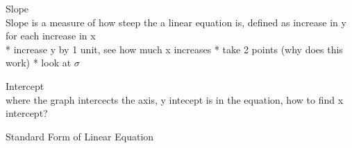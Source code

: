 \documentclass{book}
\begin{document}

  {\remark Slope \\
    Slope is a measure of how steep the a linear equation is, defined as increase in y for each increase in x\\

    * increase y by 1 unit, see how much x increases
    * take 2 points (why does this work)
    * look at $\sigma$
  }

  {\remark Intercept \\
    where the graph intercects the axis, y intecept is in the equation, how to find x intercept?
  }

  {\remark Standard Form of Linear Equation 


  }
\end{document}
